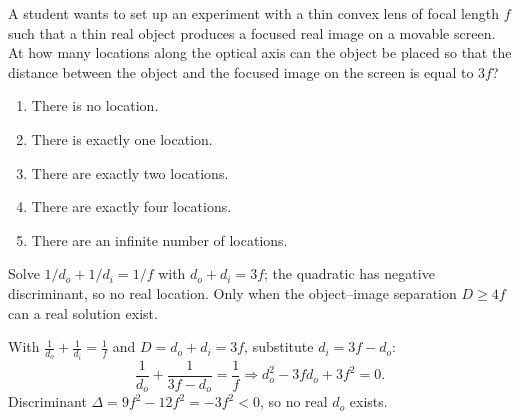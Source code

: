 \item \label{prob:21}
A student wants to set up an experiment with a thin convex lens of focal length $f$ such that a thin real object produces a focused real image on a movable screen. At how many locations along the optical axis can the object be placed so that the distance between the object and the focused image on the screen is equal to $3f$?
\begin{enumerate}[label=(\Alph*)]
    \item There is no location.
    \item There is exactly one location.
    \item There are exactly two locations.
    \item There are exactly four locations.
    \item There are an infinite number of locations.
\end{enumerate}

\begin{answerbox}
\end{answerbox}
\begin{insightbox}
Solve $1/d_o+1/d_i=1/f$ with $d_o+d_i=3f$; the quadratic has negative discriminant, so no real location. Only when the object–image separation $D\ge 4f$ can a real solution exist.
\end{insightbox}
\begin{solutionbox}

With $\tfrac{1}{d_o}+\tfrac{1}{d_i}=\tfrac{1}{f}$ and $D=d_o+d_i=3f$, substitute $d_i=3f-d_o$:
\[
\frac{1}{d_o}+\frac{1}{3f-d_o}=\frac{1}{f} \Rightarrow d_o^2-3fd_o+3f^2=0.
\]
Discriminant $\Delta=9f^2-12f^2=-3f^2<0$, so no real $d_o$ exists.
\end{solutionbox}

